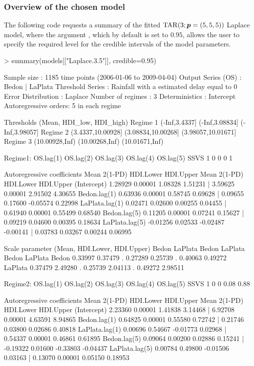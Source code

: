 \subsubsection{Overview of the chosen model}
The following code requests a summary of the fitted ${\rm TAR}(3;\bm{p}=(5,5,5))$ Laplace model, where the argument , which by default is set to $0.95$, allows the user to specify the required level for the credible intervals of the model parameters.

\begin{example}
> summary(models[["Laplace.3.5"]], credible=0.95)

Sample size          : 1185 time points (2006-01-06 to 2009-04-04)
Output Series (OS)   : Bedon    |    LaPlata
Threshold Series     : Rainfall with a estimated delay equal to 0
Error Distribution   : Laplace
Number of regimes    : 3
Deterministics       : Intercept  
Autoregressive orders: 5 in each regime

Thresholds (Mean, HDI_low, HDI_high)
Regime 1     (-Inf,3.4337]     (-Inf,3.08834]     (-Inf,3.98057]
Regime 2 (3.4337,10.00928] (3.08834,10.00268] (3.98057,10.01671]
Regime 3    (10.00928,Inf)     (10.00268,Inf)     (10.01671,Inf)

Regime1:
     OS.lag(1) OS.lag(2) OS.lag(3) OS.lag(4) OS.lag(5)
SSVS         1         0         0         0         1

Autoregressive coefficients
                  Mean  2(1-PD) HDI.Lower HDI.Upper     Mean  2(1-PD) HDI.Lower HDI.Upper
(Intercept)     1.28929 0.00001  1.08328  1.51231  |  3.59625 0.00001  2.91502  4.30655
Bedon.lag(1)    0.63936 0.00001  0.58745  0.69628  |  0.09655 0.17600 -0.05574  0.22998
LaPlata.lag(1)  0.02471 0.02600  0.00255  0.04455  |  0.61940 0.00001  0.55499  0.68540
Bedon.lag(5)    0.11205 0.00001  0.07241  0.15627  |  0.09219 0.04600  0.00395  0.18634
LaPlata.lag(5) -0.01256 0.02533 -0.02487 -0.00141  |  0.03783 0.03267  0.00244  0.06995

Scale parameter (Mean, HDI.Lower, HDI.Upper)
          Bedon LaPlata        Bedon LaPlata        Bedon LaPlata
Bedon   0.33997 0.37479    . 0.27289 0.25739    . 0.40063 0.49272
LaPlata 0.37479 2.49280    . 0.25739 2.04113    . 0.49272 2.98511

Regime2:
     OS.lag(1) OS.lag(2) OS.lag(3) OS.lag(4) OS.lag(5)
SSVS         1         0         0      0.08      0.88

Autoregressive coefficients
                  Mean  2(1-PD) HDI.Lower HDI.Upper     Mean  2(1-PD) HDI.Lower HDI.Upper
(Intercept)     2.23360 0.00001  1.41838  3.14468  |  6.92708 0.00001  4.63591  8.94865
Bedon.lag(1)    0.64825 0.00001  0.55580  0.72742  |  0.21746 0.03800  0.02686  0.40818
LaPlata.lag(1)  0.00696 0.54667 -0.01773  0.02968  |  0.54337 0.00001  0.46861  0.61895
Bedon.lag(5)    0.09064 0.00200  0.02886  0.15241  | -0.19322 0.01600 -0.33803 -0.04437
LaPlata.lag(5)  0.00784 0.49800 -0.01506  0.03163  |  0.13070 0.00001  0.05150  0.18953


\end{example}
